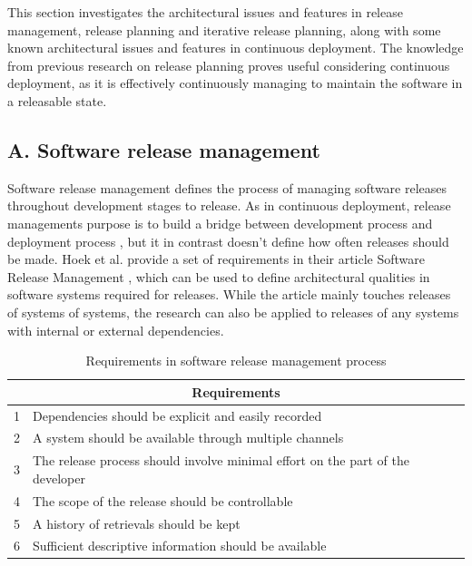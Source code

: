\documentclass[conference]{IEEEtran}
\begin{document}
This section investigates the architectural issues and features in release management, release planning and iterative release planning, along with some known architectural issues and features in continuous deployment. The knowledge from previous research on release planning proves useful considering continuous deployment, as it is effectively continuously managing to maintain the software in a releasable state.

\subsection{A. Software release management}

Software release management defines the process of managing software releases throughout development stages to release. As in continuous deployment, release managements purpose is to build a bridge between development process and deployment process \cite{van1997software}, but it in contrast doesn't define how often releases should be made. Hoek et al. provide a set of requirements in their article Software Release Management \cite{van1997software}, which can be used to define architectural qualities in software systems required for releases. While the article mainly touches releases of systems of systems, the research can also be applied to releases of any systems with internal or external dependencies.

\begin{center}
\begin{table}[h]
\caption{Requirements in software release management process}
    \begin{tabular}{ | p{0.5cm} | p{7cm} |}
    \hline
    \multicolumn{2}{|c|}{Requirements} \\
    \hline
    1 & Dependencies should be explicit and easily recorded \\ \hline
    2 & A system should be available through multiple channels \\ \hline
    3 & The release process should involve minimal effort on the part of the developer \\ \hline
    4 & The scope of the release should be controllable \\ \hline
    5 & A history of retrievals should be kept \\ \hline
    6 & Sufficient descriptive information should be available \\ \hline
    \end{tabular}
    \end{table}
\end{center}
\end{document}
